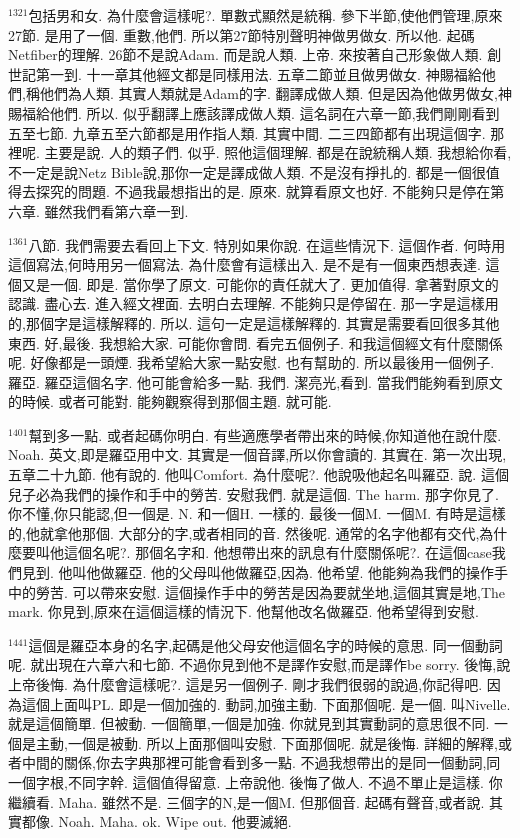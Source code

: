 \documentclass{book}
\begin{document}
$^{1321}$包括男和女.
為什麼會這樣呢?.
單數式顯然是統稱.
參下半節,使他們管理,原來27節.
是用了一個.
重數,他們.
所以第27節特別聲明神做男做女.
所以他.
起碼Netfiber的理解.
26節不是說Adam.
而是說人類.
上帝.
來按著自己形象做人類.
創世記第一到.
十一章其他經文都是同樣用法.
五章二節並且做男做女.
神賜福給他們,稱他們為人類.
其實人類就是Adam的字.
翻譯成做人類.
但是因為他做男做女,神賜福給他們.
所以.
似乎翻譯上應該譯成做人類.
這名詞在六章一節,我們剛剛看到五至七節.
九章五至六節都是用作指人類.
其實中間.
二三四節都有出現這個字.
那裡呢.
主要是說.
人的類子們.
似乎.
照他這個理解.
都是在說統稱人類.
我想給你看,不一定是說Netz Bible說,那你一定是譯成做人類.
不是沒有掙扎的.
都是一個很值得去探究的問題.
不過我最想指出的是.
原來.
就算看原文也好.
不能夠只是停在第六章.
雖然我們看第六章一到.

$^{1361}$八節.
我們需要去看回上下文.
特別如果你說.
在這些情況下.
這個作者.
何時用這個寫法,何時用另一個寫法.
為什麼會有這樣出入.
是不是有一個東西想表達.
這個又是一個.
即是.
當你學了原文.
可能你的責任就大了.
更加值得.
拿著對原文的認識.
盡心去.
進入經文裡面.
去明白去理解.
不能夠只是停留在.
那一字是這樣用的,那個字是這樣解釋的.
所以.
這句一定是這樣解釋的.
其實是需要看回很多其他東西.
好,最後.
我想給大家.
可能你會問.
看完五個例子.
和我這個經文有什麼關係呢.
好像都是一頭煙.
我希望給大家一點安慰.
也有幫助的.
所以最後用一個例子.
羅亞.
羅亞這個名字.
他可能會給多一點.
我們.
潔亮光,看到.
當我們能夠看到原文的時候.
或者可能對.
能夠觀察得到那個主題.
就可能.

$^{1401}$幫到多一點.
或者起碼你明白.
有些適應學者帶出來的時候,你知道他在說什麼.
Noah.
英文,即是羅亞用中文.
其實是一個音譯,所以你會讀的.
其實在.
第一次出現,五章二十九節.
他有說的.
他叫Comfort.
為什麼呢?.
他說吸他起名叫羅亞.
說.
這個兒子必為我們的操作和手中的勞苦.
安慰我們.
就是這個.
The harm.
那字你見了.
你不懂,你只能認,但一個是.
N.
和一個H.
一樣的.
最後一個M.
一個M.
有時是這樣的,他就拿他那個.
大部分的字,或者相同的音.
然後呢.
通常的名字他都有交代,為什麼要叫他這個名呢?.
那個名字和.
他想帶出來的訊息有什麼關係呢?.
在這個case我們見到.
他叫他做羅亞.
他的父母叫他做羅亞,因為.
他希望.
他能夠為我們的操作手中的勞苦.
可以帶來安慰.
這個操作手中的勞苦是因為要就坐地,這個其實是地,The mark.
你見到,原來在這個這樣的情況下.
他幫他改名做羅亞.
他希望得到安慰.

$^{1441}$這個是羅亞本身的名字,起碼是他父母安他這個名字的時候的意思.
同一個動詞呢.
就出現在六章六和七節.
不過你見到他不是譯作安慰,而是譯作be sorry.
後悔,說上帝後悔.
為什麼會這樣呢?.
這是另一個例子.
剛才我們很弱的說過,你記得吧.
因為這個上面叫PL.
即是一個加強的.
動詞,加強主動.
下面那個呢.
是一個.
叫Nivelle.
就是這個簡單.
但被動.
一個簡單,一個是加強.
你就見到其實動詞的意思很不同.
一個是主動,一個是被動.
所以上面那個叫安慰.
下面那個呢.
就是後悔.
詳細的解釋,或者中間的關係,你去字典那裡可能會看到多一點.
不過我想帶出的是同一個動詞,同一個字根,不同字幹.
這個值得留意.
上帝說他.
後悔了做人.
不過不單止是這樣.
你繼續看.
Maha.
雖然不是.
三個字的N,是一個M.
但那個音.
起碼有聲音,或者說.
其實都像.
Noah.
Maha.
ok.
Wipe out.
他要滅絕.
\end{document}
